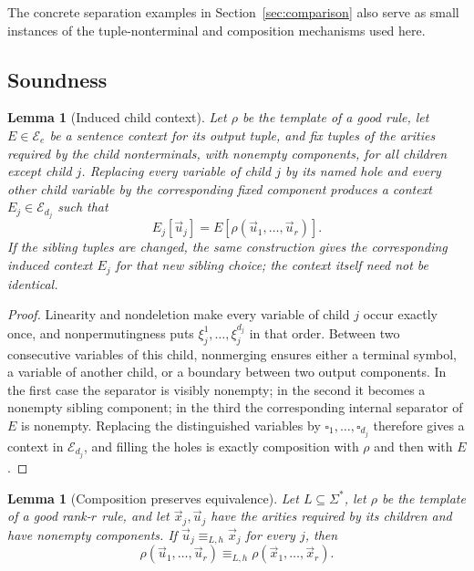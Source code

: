 \documentclass[11pt]{article}
\numberwithin{equation}{section}
\theoremstyle{plain}
\newtheorem{lemma}[theorem]{Lemma}
\theoremstyle{definition}
\theoremstyle{remark}
\newcommand{\tuple}[1]{\vec{#1}}
\newcommand{\blank}{\square}
\begin{document}
The concrete separation examples in Section~\ref{sec:comparison} also serve as
small instances of the tuple-nonterminal and composition mechanisms used here.

\subsection{Soundness}
\label{sec:soundness}

\begin{lemma}[Induced child context]
\label{lem:filling-identity}
Let $\rho$ be the template of a good rule, let
$E\in\mathcal E_e$ be a sentence context for its output tuple, and fix tuples of the arities required by the child nonterminals, with nonempty
components, for all children except child $j$.
Replacing every variable of child $j$ by its named hole and every other child
variable by the corresponding fixed component produces a context
$E_j\in\mathcal E_{d_j}$
such that
\[
 E_j[\tuple u_j]=E[\rho(\tuple u_1,\ldots,\tuple u_r)].
\]
If the sibling tuples are changed, the same construction gives the
corresponding induced context $E_j$ for that new sibling choice; the context
itself need not be identical.
\end{lemma}

\begin{proof}
Linearity and nondeletion make every variable of child $j$ occur exactly once,
and nonpermutingness puts $\xi_j^1,\ldots,\xi_j^{d_j}$ in that order.  Between two
consecutive variables of this child, nonmerging ensures either a terminal
symbol, a variable of another child, or a boundary between two output
components.  In the first case the separator is visibly nonempty; in the
second it becomes a nonempty sibling component; in the third the corresponding
internal separator of $E$ is nonempty.  Replacing the distinguished variables
by $\blank_1,\ldots,\blank_{d_j}$ therefore gives a context in
$\mathcal E_{d_j}$, and filling the holes is exactly composition with $\rho$
and then with $E$.
\end{proof}

\begin{lemma}[Composition preserves equivalence]
\label{lem:witnessed-composition}
Let $L\subseteq\Sigma^*$, let $\rho$ be the template of a good rank-$r$ rule, and let
$\tuple x_j,\tuple u_j$ have the arities required by its children and have
nonempty components.  If
$\tuple u_j\equiv_{L,h}\tuple x_j$ for every $j$, then
\[
 \rho(\tuple u_1,\ldots,\tuple u_r)
 \equiv_{L,h}
 \rho(\tuple x_1,\ldots,\tuple x_r).
\]
\end{lemma}
\end{document}
